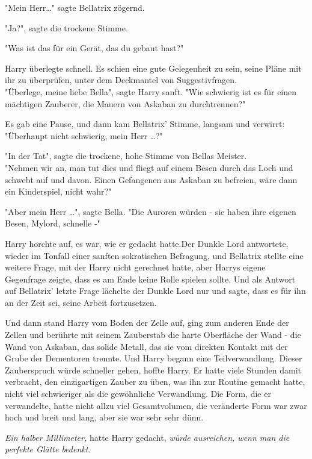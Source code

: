 {"Mein Herr…" sagte Bellatrix zögernd.

"Ja?", sagte die trockene Stimme.

"Was ist das für ein Gerät, das du gebaut hast?"

Harry überlegte schnell. Es schien eine gute Gelegenheit zu sein, seine Pläne mit ihr zu überprüfen, unter dem Deckmantel von Suggestivfragen.\\ "Überlege, meine liebe Bella", sagte Harry sanft. "Wie schwierig ist es für einen mächtigen Zauberer, die Mauern von Askaban zu durchtrennen?"

Es gab eine Pause, und dann kam Bellatrix' Stimme, langsam und verwirrt:\\ "Überhaupt nicht schwierig, mein Herr …?"

"In der Tat", sagte die trockene, hohe Stimme von Bellas Meister.\\ "Nehmen wir an, man tut dies und fliegt auf einem Besen durch das Loch und schwebt auf und davon. Einen Gefangenen aus Askaban zu befreien, wäre dann ein Kinderspiel, nicht wahr?"

"Aber mein Herr …", sagte Bella. "Die Auroren würden - sie haben ihre eigenen Besen, Mylord, schnelle -"

Harry horchte auf, es war, wie er gedacht hatte.Der Dunkle Lord antwortete, wieder im Tonfall einer sanften sokratischen Befragung, und Bellatrix stellte eine weitere Frage, mit der Harry nicht gerechnet hatte, aber Harrys eigene Gegenfrage zeigte, dass es am Ende keine Rolle spielen sollte. Und als Antwort auf Bellatrix' letzte Frage lächelte der Dunkle Lord nur und sagte, dass es für ihn an der Zeit sei, seine Arbeit fortzusetzen.

Und dann stand Harry vom Boden der Zelle auf, ging zum anderen Ende der Zellen und berührte mit seinem Zauberstab die harte Oberfläche der Wand - die Wand von Askaban, das solide Metall, das sie vom direkten Kontakt mit der Grube der Dementoren trennte. Und Harry begann eine Teilverwandlung. Dieser Zauberspruch würde schneller gehen, hoffte Harry. Er hatte viele Stunden damit verbracht, den einzigartigen Zauber zu üben, was ihn zur Routine gemacht hatte, nicht viel schwieriger als die gewöhnliche Verwandlung. Die Form, die er verwandelte, hatte nicht allzu viel Gesamtvolumen, die veränderte Form war zwar hoch und breit und lang, aber sie war sehr sehr dünn.

\emph{Ein halber Millimeter,} hatte Harry gedacht, \emph{würde ausreichen, wenn man die perfekte Glätte bedenkt.}

}
